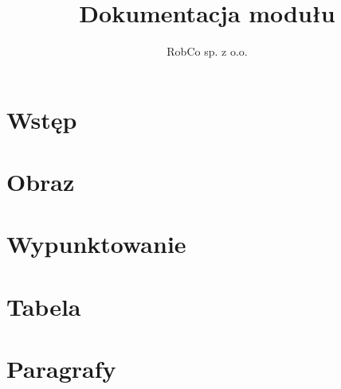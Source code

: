 \documentclass[
12pt, %
a4paper
]{report}
\title{Dokumentacja modułu}
\author{RobCo sp. z o.o.}
\newcommand\blankpage{%
    \null
    \thispagestyle{empty}%
    \addtocounter{page}{-1}%
    \newpage
}
\begin{document}
			


	

	\afterpage{\blankpage}
	
	

	\chapter{Wstęp}
		
						
	\chapter{Obraz}
		

	\chapter{Wypunktowanie}
		
		
    \chapter{Tabela}
        
    
    \chapter{Paragrafy}
        
        
\end{document}
